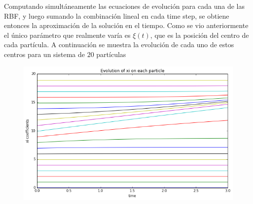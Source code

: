 \documentclass[spanish]{article}
\begin{document}
    Computando simultáneamente las ecuaciones de evolución para cada una de las RBF, y luego sumando la combinación lineal en cada time step, se obtiene entonces la aproximación de la solución en el tiempo. Como se vio anteriormente el único parámetro que realmente varía es $\xi(t)$, que es la posición del centro de cada partícula. A continuación se muestra la evolución de cada uno de estos centros para un sistema de $20$ partículas
    \begin{figure}[H]
      \centering
      \includegraphics[scale=0.5]{xis.png}
    \end{figure}
    
\end{document}
